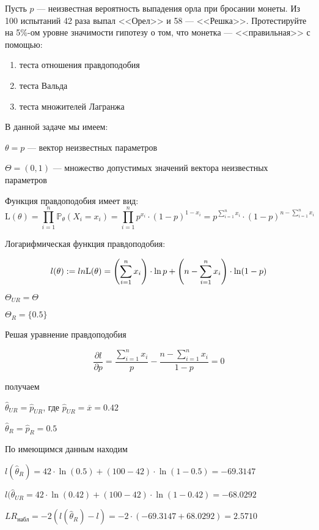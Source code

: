 \documentclass[pdftex,11pt,openany]{book}\usepackage[]{graphicx}\usepackage[]{color}
\begin{document}
\begin{problem}
Пусть $p$ --- неизвестная вероятность выпадения орла при бросании монеты. Из 100 испытаний  42 раза выпал <<Орел>> и 58 --- <<Решка>>. Протестируйте на 5\%-ом уровне значимости гипотезу о том, что монетка --- <<правильная>> с помощью: 
\begin{enumerate}
\item теста отношения правдоподобия
\item теста Вальда
\item теста множителей Лагранжа
\end{enumerate}
\end{problem}

\begin{solution}
В данной задаче мы имеем:

$\theta = p$ --- вектор неизвестных параметров

$\Theta = (0, 1)$ --- множество допустимых значений вектора неизвестных параметров

Функция правдоподобия имеет вид:
$$\text{L}(\theta) = \prod_{i=1}^n \mathbb{P}_{\theta}(X_i = x_i) = \prod_{i=1}^n p^{x_i} \cdot (1-p)^{1-x_i} = p^{\sum_{i=1}^n x_i} \cdot (1-p)^{n - \sum_{i=1}^n x_i}$$

Логарифмическая функция правдоподобия:

$$l(\theta) := \\ln \text{L}(\theta) = \left( \sum_{i=1}^n x_i \right) \cdot \ln p + \left(n - \sum_{i=1}^n x_i \right) \cdot \ln (1 - p)$$

$\Theta_{UR} = \Theta$

$\Theta_{R} = \{0.5\}$

Решая уравнение правдоподобия

$$\frac{\partial l}{\partial p} = \frac{\sum_{i=1}^n x_i}{p} - \frac{n - \sum_{i=1}^n x_i}{1 - p} = 0$$

получаем

$\hat{\theta}_{UR} = \hat{p}_{UR}$, где $\hat{p}_{UR} = \overline{x} = 0.42$

$\hat{\theta}_{R} = \hat{p}_{R} = 0.5$

По имеющимся данным находим

$l(\hat{\theta}_{R}) = 42 \cdot \ln(0.5) + (100-42) \cdot \ln(1-0.5) = -69.3147$

$l(\hat{\theta}_{UR} = 42 \cdot \ln(0.42) + (100-42) \cdot \ln(1-0.42) = -68.0292$

$LR_{\text{набл}} = -2(l(\hat{\theta}_{R}) - l) = -2 \cdot (-69.3147 + 68.0292) = 2.5710$


\end{solution}
\end{document}
